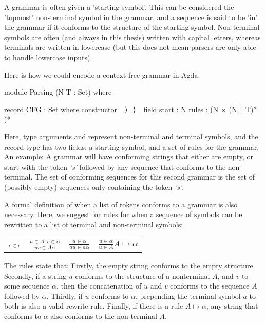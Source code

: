	A grammar is often given a 'starting symbol'. This can be considered the
	'topmost' non-terminal symbol in the grammar, and a sequence is said to be
	'in' the grammar if it conforms to the structure of the starting symbol.
	Non-terminal symbols are often (and always in this thesis) written with
	capital letters, whereas terminals are written in lowercase (but this does
	not mean parsers are only able to handle lowercase inputs).

	Here is how we could encode a context-free grammar in Agda:

	\begin{code}
		module Parsing (N T : Set) where

		record CFG : Set where
		  constructor _⟩_⟩_
		  field
		    start : N
		    rules : (N × (N ∣ T)* )*
	\end{code}

	Here, type arguments  and  represent non-terminal and
	terminal symbols, and the record type has two fields: a starting symbol,
	and a set of rules for the grammar.  An example: A grammar  will have conforming strings that
	either are empty, or start with the token \emph{'s'} followed by any
	sequence that conforms to the  non-terminal. The set of
	conforming sequences for this second grammar is the set of (possibly empty)
	sequences only containing the token \emph{'s'}.

	A formal definition of when a list of tokens conforms to a grammar is also
	necessary. Here, we suggest for rules for when a sequence of symbols can be 
	rewritten to a list of terminal and non-terminal symbols:

	\begin{table}[h]
	\centering
	\begin{tabular}{cccc}
			 \( \displaystyle \frac{\ }{\epsilon\in\epsilon} \) &
			 \( \displaystyle \frac{u\in A\ \ v\in\alpha}{uv\in A\alpha} \) &
			 \( \displaystyle \frac{u\in\alpha}{au\in a\alpha} \) &
			 \( \displaystyle \frac{u\in\alpha}{u\in A}A \mapsto \alpha \)
	\end{tabular}
	\end{table}

	The rules state that: Firstly, the empty string conforms to the empty
	structure. Secondly, if a string $u$ conforms to the structure of a
	nonterminal $A$, and $v$ to some sequence $\alpha$, then the concatenation
	of $u$ and $v$ conforms to the sequence $A$ followed by $\alpha$. Thirdly,
	if $u$ conforms to $\alpha$, prepending the terminal symbol $a$ to both is
	also a valid rewrite rule. Finally, if there is a rule $A \mapsto \alpha$,
	any string that conforms to $\alpha$ also conforms to the non-terminal $A$.

